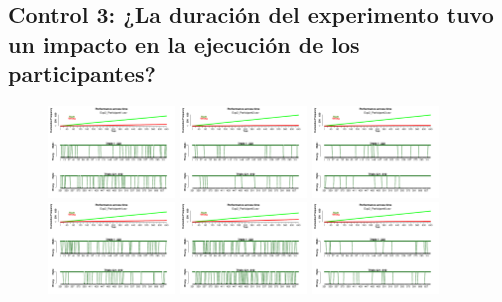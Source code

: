 \subsection{Control 3: ¿La duración del experimento tuvo un impacto en la ejecución de los participantes?}


\begin{figure}[th]
\centering
\includegraphics[width=0.30\textwidth]{Figures/Success_Exp2_P1} \includegraphics[width=0.30\textwidth]{Figures/Success_Exp2_P2} \includegraphics[width=0.30\textwidth]{Figures/Success_Exp2_P3}
\includegraphics[width=0.30\textwidth]{Figures/Success_Exp2_P4} \includegraphics[width=0.30\textwidth]{Figures/Success_Exp2_P5} \includegraphics[width=0.30\textwidth]{Figures/Success_Exp2_P6}

\end{figure}
